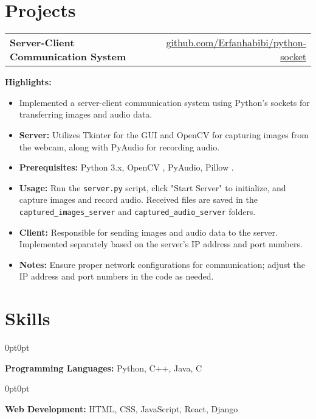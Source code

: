 \documentclass[10pt, a4paper]{article}
\newenvironment{onecolentry}{
    \begin{adjustwidth}{0pt}{0pt}
}{\end{adjustwidth}}
\begin{document}
\section{Projects}

\begin{tabularx}{\textwidth}{Xr}
    \textbf{Server-Client Communication System} & \href{https://github.com/Erfanhabibi/python-socket.git}{github.com/Erfanhabibi/python-socket} \\
\end{tabularx}

\vspace{0.1 cm}

\textbf{Highlights:}
\begin{itemize}
    \item Implemented a server-client communication system using Python's sockets for transferring images and audio data.
    \item \textbf{Server:} Utilizes Tkinter for the GUI and OpenCV for capturing images from the webcam, along with PyAudio for recording audio.
    \item \textbf{Prerequisites:} Python 3.x, OpenCV , PyAudio, Pillow .
    \item \textbf{Usage:} Run the \texttt{server.py} script, click "Start Server" to initialize, and capture images and record audio. Received files are saved in the \texttt{captured\_images\_server} and \texttt{captured\_audio\_server} folders.
    \item \textbf{Client:} Responsible for sending images and audio data to the server. Implemented separately based on the server's IP address and port numbers.
    \item \textbf{Notes:} Ensure proper network configurations for communication; adjust the IP address and port numbers in the code as needed.
\end{itemize}



\section{Skills}

\begin{onecolentry}
    \textbf{Programming Languages:} Python, C++, Java, C
\end{onecolentry}

\vspace{0.1 cm}

\begin{onecolentry}
    \textbf{Web Development:} HTML, CSS, JavaScript, React, Django
\end{onecolentry}
\end{document}

